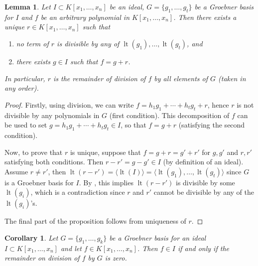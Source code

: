 \documentclass[
]{book}
\newtheorem{lemma}{Lemma}[chapter]
\newtheorem{corollary}{Corollary}[chapter]
\theoremstyle{definition}
\theoremstyle{definition}
\theoremstyle{definition}
\theoremstyle{definition}
\theoremstyle{remark}
\begin{document}
\begin{lemma}
\protect\hypertarget{lem:remainder-condition}{}\label{lem:remainder-condition}Let \(I \subset K[x_1,\ldots,x_n]\) be an ideal, \(G = \{g_1,\ldots, g_t\}\) be a Groebner basis for \(I\) and \(f\) be an arbitrary polynomial in \(K[x_1,\ldots,x_n]\).
Then there exists a unique \(r \in K[x_1,\ldots,x_n]\) such that

\begin{enumerate}
\def\labelenumi{\arabic{enumi}.}
\item
  no term of \(r\) is divisible by any of \(\operatorname{lt}(g_1), \ldots, \operatorname{lt}(g_t)\), and
\item
  there exists \(g\in I\) such that \(f = g + r\).
\end{enumerate}

In particular, \(r\) is the remainder of division of \(f\) by all elements of \(G\) (taken in any order).
\end{lemma}

\begin{proof}
Firstly, using division, we can write \(f = h_1 g_1 + \cdots + h_t g_t + r\), hence \(r\) is not divisible by any polynomials in \(G\) (first condition).
This decomposition of \(f\) can be used to set \(g = h_1 g_1 + \cdots + h_t g_t \in I\), so that \(f = g + r\) (satisfying the second condition).

Now, to prove that \(r\) is unique, suppose that \(f = g + r = g' + r'\) for \(g,g'\) and \(r,r'\) satisfying both conditions. Then \(r-r' = g-g' \in I\) (by definition of an ideal). Assume \(r\ne r'\), then \(\operatorname{lt}(r-r') = \langle \operatorname{lt}(I)\rangle = \langle \operatorname{lt}(g_1),\ldots, \operatorname{lt}(g_t) \rangle\) since \(G\) is a Groebner basis for \(I\). By \citep[ p70, Lemma 2]{cox2013}, this implies \(\operatorname{lt}(r-r')\) is divisible by some \(\operatorname{lt}(g_i)\), which is a contradiction since \(r\) and \(r'\) cannot be divisible by any of the \(\operatorname{lt}(g_i)\)'s.

The final part of the proposition follows from uniqueness of \(r\).
\end{proof}

\begin{corollary}
\protect\hypertarget{cor:div-zero}{}\label{cor:div-zero}Let \(G = \{ g_1,\ldots,g_k \}\) be a Groebner basis for an ideal \(I \subset K[x_1,\ldots,x_n]\) and let \(f \in K[x_1,\ldots,x_n]\). Then \(f \in I\) if and only if the remainder on division of \(f\) by \(G\) is zero.
\end{corollary}
\end{document}
